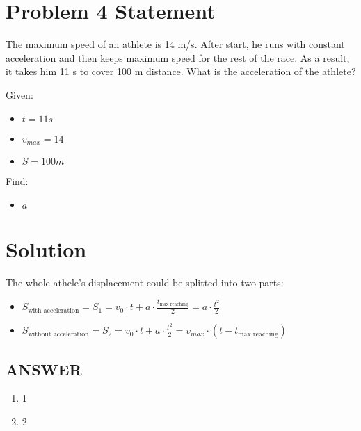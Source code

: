 \section*{Problem 4 Statement}

The maximum speed of an athlete is 14 m/s. After start, he runs with constant acceleration and
then keeps maximum speed for the rest of the race. As a result, it takes him 11 s to cover 100 m
distance. What is the acceleration of the athlete?

\bigbreak Given:

\begin{itemize}
    \item $t = 11s$
    \item $v_{max} = 14$
    \item $S = 100m$
\end{itemize}

\bigbreak Find:

\begin{itemize}
    \item $a$
\end{itemize}

\section*{Solution}

The whole athele's displacement could be splitted into two parts:

\begin{itemize}
    \item $S_{\text{with acceleration}} = S_1 = v_0 \cdot t + a \cdot \frac{t_{\text{max reaching}}}{2} = a \cdot \frac{t^2}{2}$
    \item $ S_{\text{without acceleration}} = S_2 = v_0 \cdot t + a \cdot \frac{t^2}{2} = v_{max} \cdot (t - t_{\text{max reaching}})$
\end{itemize}

\vfill \subsection*{ANSWER}
\begin{enumerate}
    \item 1
    \item 2
\end{enumerate}
